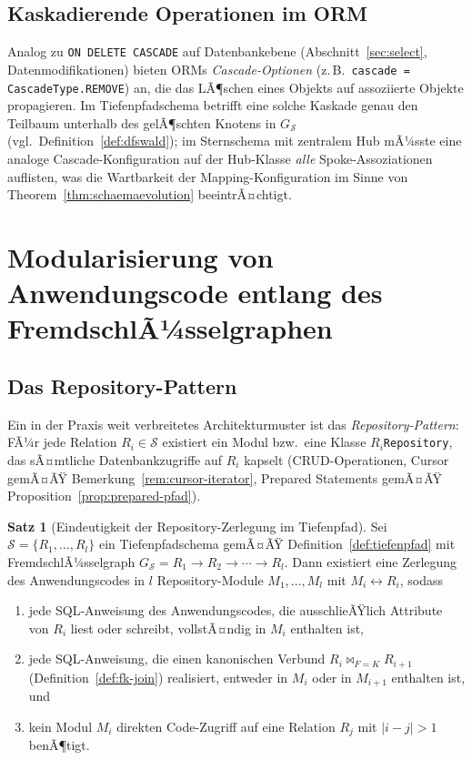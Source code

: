 ﻿\documentclass[a4paper,12pt]{report}
\theoremstyle{definition}
\newtheorem{theorem}{Satz}[chapter]
\theoremstyle{remark}
\begin{document}
\subsection{Kaskadierende Operationen im ORM}

Analog zu \texttt{ON DELETE CASCADE} auf Datenbankebene
(Abschnitt~\ref{sec:select}, Datenmodifikationen) bieten ORMs
\emph{Cascade-Optionen} (z.\,B.\ \texttt{cascade =
CascadeType.REMOVE}) an, die das LÃ¶schen eines Objekts auf assoziierte
Objekte propagieren. Im Tiefenpfadschema betrifft eine solche Kaskade
genau den Teilbaum unterhalb des gelÃ¶schten Knotens in
$G_{\mathcal{S}}$ (vgl.\ Definition~\ref{def:dfswald}); im
Sternschema mit zentralem Hub mÃ¼sste eine analoge
Cascade-Konfiguration auf der Hub-Klasse \emph{alle} Spoke-Assoziationen
auflisten, was die Wartbarkeit der Mapping-Konfiguration im Sinne von
Theorem~\ref{thm:schaemaevolution} beeintrÃ¤chtigt.

\section{Modularisierung von Anwendungscode entlang des FremdschlÃ¼sselgraphen}
\label{sec:modularisierung}

\subsection{Das Repository-Pattern}
\label{sec:repository-pattern}

Ein in der Praxis weit verbreitetes Architekturmuster ist das
\emph{Repository-Pattern}: FÃ¼r jede Relation $R_i\in\mathcal{S}$
existiert ein Modul bzw.\ eine Klasse \texttt{$R_i$Repository}, das
sÃ¤mtliche Datenbankzugriffe auf $R_i$ kapselt (CRUD-Operationen,
Cursor gemÃ¤ÃŸ Bemerkung~\ref{rem:cursor-iterator}, Prepared Statements
gemÃ¤ÃŸ Proposition~\ref{prop:prepared-pfad}).

\begin{theorem}[Eindeutigkeit der Repository-Zerlegung im Tiefenpfad]
\label{thm:repository-zerlegung}
Sei $\mathcal{S}=\{R_1,\ldots,R_l\}$ ein Tiefenpfadschema gemÃ¤ÃŸ
Definition~\ref{def:tiefenpfad} mit FremdschlÃ¼sselgraph
$G_{\mathcal{S}}=R_1\to R_2\to\cdots\to R_l$. Dann existiert eine
Zerlegung des Anwendungscodes in $l$ Repository-Module
$M_1,\ldots,M_l$ mit $M_i \leftrightarrow R_i$, sodass
\begin{enumerate}
  \item jede SQL-Anweisung des Anwendungscodes, die ausschlieÃŸlich
    Attribute von $R_i$ liest oder schreibt, vollstÃ¤ndig in $M_i$
    enthalten ist,
  \item jede SQL-Anweisung, die einen kanonischen Verbund
    $R_i\Join_{F=K}R_{i+1}$ (Definition~\ref{def:fk-join}) realisiert,
    entweder in $M_i$ oder in $M_{i+1}$ enthalten ist, und
  \item kein Modul $M_i$ direkten Code-Zugriff auf eine Relation
    $R_j$ mit $|i-j|>1$ benÃ¶tigt.
\end{enumerate}
\end{theorem}
\end{document}
